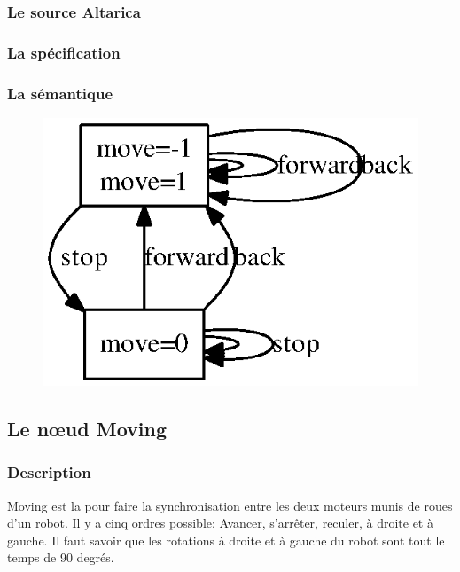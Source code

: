    \subsubsection{Le source Altarica}
   
   
   \subsubsection{La spécification}
   
   
   \subsubsection{La sémantique}
   \begin{figure}[!ht]
    \begin{center}
     \includegraphics{../src/altarica/Motor.eps}
    \end{center}
   \end{figure}

  \subsection{Le n\oe{}ud Moving}

   \subsubsection{Description}
   Moving est la pour faire la synchronisation entre les deux moteurs
   munis de roues d'un robot. Il y a cinq ordres possible: Avancer,
   s'arrêter, reculer, à droite et à gauche. Il faut savoir que les
   rotations à droite et à gauche du robot sont tout le temps de 90
   degrés.

